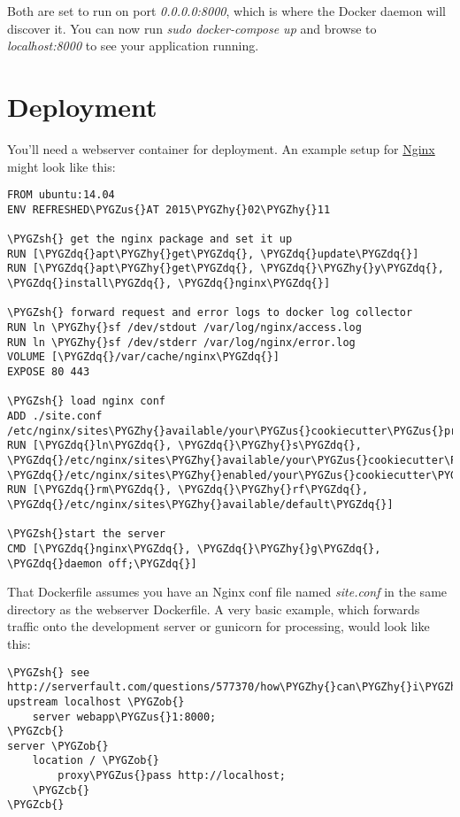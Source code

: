 \documentclass[letterpaper,10pt,english]{sphinxmanual}
\def\PYGZus{\char`\_}
\def\PYGZob{\char`\{}
\def\PYGZcb{\char`\}}
\def\PYGZsh{\char`\#}
\def\PYGZhy{\char`\-}
\def\PYGZdq{\char`\"}
\begin{document}
Both are set to run on port \emph{0.0.0.0:8000}, which is where the Docker daemon will discover it. You can now run \emph{sudo docker-compose up} and browse to \emph{localhost:8000} to see your application running.


\section{Deployment}
\label{docker_ec2:deployment}
You'll need a webserver container for deployment. An example setup for \href{http://wiki.nginx.org/Main}{Nginx} might look like this:

\begin{Verbatim}[commandchars=\\\{\}]
FROM ubuntu:14.04
ENV REFRESHED\PYGZus{}AT 2015\PYGZhy{}02\PYGZhy{}11

\PYGZsh{} get the nginx package and set it up
RUN [\PYGZdq{}apt\PYGZhy{}get\PYGZdq{}, \PYGZdq{}update\PYGZdq{}]
RUN [\PYGZdq{}apt\PYGZhy{}get\PYGZdq{}, \PYGZdq{}\PYGZhy{}y\PYGZdq{}, \PYGZdq{}install\PYGZdq{}, \PYGZdq{}nginx\PYGZdq{}]

\PYGZsh{} forward request and error logs to docker log collector
RUN ln \PYGZhy{}sf /dev/stdout /var/log/nginx/access.log
RUN ln \PYGZhy{}sf /dev/stderr /var/log/nginx/error.log
VOLUME [\PYGZdq{}/var/cache/nginx\PYGZdq{}]
EXPOSE 80 443

\PYGZsh{} load nginx conf
ADD ./site.conf /etc/nginx/sites\PYGZhy{}available/your\PYGZus{}cookiecutter\PYGZus{}project
RUN [\PYGZdq{}ln\PYGZdq{}, \PYGZdq{}\PYGZhy{}s\PYGZdq{}, \PYGZdq{}/etc/nginx/sites\PYGZhy{}available/your\PYGZus{}cookiecutter\PYGZus{}project\PYGZdq{}, \PYGZdq{}/etc/nginx/sites\PYGZhy{}enabled/your\PYGZus{}cookiecutter\PYGZus{}project\PYGZdq{}]
RUN [\PYGZdq{}rm\PYGZdq{}, \PYGZdq{}\PYGZhy{}rf\PYGZdq{}, \PYGZdq{}/etc/nginx/sites\PYGZhy{}available/default\PYGZdq{}]

\PYGZsh{}start the server
CMD [\PYGZdq{}nginx\PYGZdq{}, \PYGZdq{}\PYGZhy{}g\PYGZdq{}, \PYGZdq{}daemon off;\PYGZdq{}]
\end{Verbatim}

That Dockerfile assumes you have an Nginx conf file named \emph{site.conf} in the same directory as the webserver Dockerfile. A very basic example, which forwards traffic onto the development server or gunicorn for processing, would look like this:

\begin{Verbatim}[commandchars=\\\{\}]
\PYGZsh{} see http://serverfault.com/questions/577370/how\PYGZhy{}can\PYGZhy{}i\PYGZhy{}use\PYGZhy{}environment\PYGZhy{}variables\PYGZhy{}in\PYGZhy{}nginx\PYGZhy{}conf\PYGZsh{}comment730384\PYGZus{}577370
upstream localhost \PYGZob{}
    server webapp\PYGZus{}1:8000;
\PYGZcb{}
server \PYGZob{}
    location / \PYGZob{}
        proxy\PYGZus{}pass http://localhost;
    \PYGZcb{}
\PYGZcb{}
\end{Verbatim}
\end{document}

